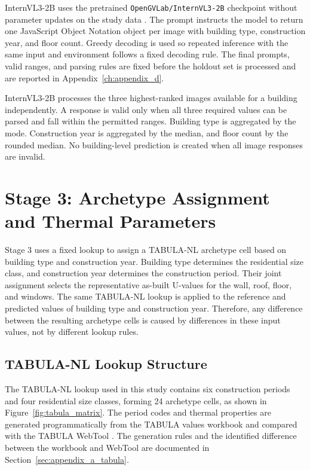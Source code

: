 InternVL3-2B uses the pretrained \texttt{OpenGVLab/\allowbreak InternVL3-2B} checkpoint without parameter updates on the study data \parencite{zhu2025}.
The prompt instructs the model to return one JavaScript Object Notation object per image with building type, construction year, and floor count.
Greedy decoding is used so repeated inference with the same input and environment follows a fixed decoding rule.
The final prompts, valid ranges, and parsing rules are fixed before the holdout set is processed and are reported in Appendix~\ref{ch:appendix_d}.

InternVL3-2B processes the three highest-ranked images available for a building independently.
A response is valid only when all three required values can be parsed and fall within the permitted ranges.
Building type is aggregated by the mode.
Construction year is aggregated by the median, and floor count by the rounded median.
No building-level prediction is created when all image responses are invalid.

\section{Stage 3: Archetype Assignment and Thermal Parameters}
\label{sec:tabula_archetype_matching}

Stage 3 uses a fixed lookup to assign a TABULA-NL archetype cell based on building type and construction year. Building type determines the residential size class, and construction year determines the construction period. Their joint assignment selects the representative as-built U-values for the wall, roof, floor, and windows. The same TABULA-NL lookup is applied to the reference and predicted values of building type and construction year. Therefore, any difference between the resulting archetype cells is caused by differences in these input values, not by different lookup rules.

\subsection{TABULA-NL Lookup Structure}
\label{sec:tabula_nl_matrix}

The TABULA-NL lookup used in this study contains six construction periods and four residential size classes, forming 24 archetype cells, as shown in Figure~\ref{fig:tabula_matrix}.
The period codes and thermal properties are generated programmatically from the \acs{TABULA} values workbook and compared with the \acs{TABULA} WebTool \parencite{tabulawebtool}.
The generation rules and the identified difference between the workbook and WebTool are documented in Section~\ref{sec:appendix_a_tabula}.

